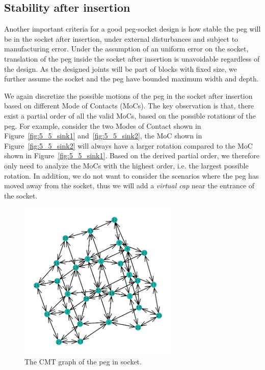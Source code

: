 \documentclass[letterpaper, 10 pt, conference]{ieeeconf}
\begin{document}
\subsection{Stability after insertion}

Another important criteria for a good peg-socket design is how stable the peg will be in the socket after insertion, under external disturbances and subject to manufacturing error. Under the assumption of an uniform error on the socket, translation of the peg inside the socket after insertion is unavoidable regardless of the design. As the designed joints will be part of blocks with fixed size, we further assume the socket and the peg have bounded maximum width and depth. 



We again discretize the possible motions of the peg in the socket after insertion based on different Mode of Contacts (MoCs). The key observation is that, there exist a partial order of all the valid MoCs, based on the possible rotations of the peg. For example, consider the two Modes of Contact shown in Figure~\ref{fig:5_5_sink1} and~\ref{fig:5_5_sink2}, the MoC shown in Figure~\ref{fig:5_5_sink2} will always have a larger rotation compared to the MoC shown in Figure~\ref{fig:5_5_sink1}. Based on the derived partial order, we therefore only need to analyze the MoCs with the highest order, i.e. the largest possible rotation. In addition, we do not want to consider the scenarios where the peg has moved away from the socket, thus we will add a {\em virtual cap} near the entrance of the socket. 

\begin{figure}[t]
\begin{center}
\includegraphics[width=3in]{figures/rocking_graph.png}
\end{center}
\caption{The CMT graph of the peg in socket. }
\label{fig:rocking_graph}
\end{figure}
\end{document}
